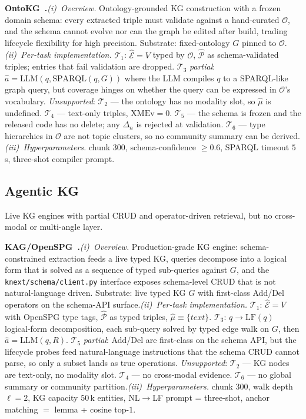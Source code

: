 \documentclass{article}
\begin{document}
\noindent\textbf{OntoKG~\citep{OntoKG}.}\quad\emph{(i)~Overview.} Ontology-grounded KG construction with a frozen domain schema: every extracted triple must validate against a hand-curated $\mathcal{O}$, and the schema cannot evolve nor can the graph be edited after build, trading lifecycle flexibility for high precision. Substrate: fixed-ontology $G$ pinned to $\mathcal{O}$.\quad\emph{(ii)~Per-task implementation.} $\mathcal{T}_1$: $\hat{\mathcal{E}}\!=\!V$ typed by $\mathcal{O}$, $\hat{\mathcal{P}}$ as schema-validated triples; entries that fail validation are dropped. $\mathcal{T}_3$ \emph{partial}: $\hat{a}\!=\!\mathrm{LLM}(q,\mathrm{SPARQL}(q,G))$ where the LLM compiles $q$ to a SPARQL-like graph query, but coverage hinges on whether the query can be expressed in $\mathcal{O}$'s vocabulary. \emph{Unsupported}: $\mathcal{T}_2$ — the ontology has no modality slot, so $\hat{\mu}$ is undefined. $\mathcal{T}_4$ — text-only triples, $\mathrm{XMEv}\!=\!0$. $\mathcal{T}_5$ — the schema is frozen and the released code has no delete; any $\Delta_n$ is rejected at validation. $\mathcal{T}_6$ — type hierarchies in $\mathcal{O}$ are not topic clusters, so no community summary can be derived.\quad\emph{(iii)~Hyperparameters.} chunk $300$, schema-confidence $\geq\!0.6$, SPARQL timeout $5$\,s, three-shot compiler prompt.

\subsection{Agentic KG}\label{app:b-akg}

Live KG engines with partial CRUD and operator-driven retrieval, but no cross-modal or multi-angle layer.

\noindent\textbf{KAG/OpenSPG~\citep{KAG}.}\quad\emph{(i)~Overview.} Production-grade KG engine: schema-constrained extraction feeds a live typed KG, queries decompose into a logical form that is solved as a sequence of typed sub-queries against $G$, and the \texttt{knext/schema/client.py} interface exposes schema-level CRUD that is not natural-language driven. Substrate: live typed KG $G$ with first-class Add/Del operators on the schema-API surface.\quad\emph{(ii)~Per-task implementation.} $\mathcal{T}_1$: $\hat{\mathcal{E}}\!=\!V$ with OpenSPG type tags, $\hat{\mathcal{P}}$ as typed triples, $\hat{\mu}\!\equiv\!\{\textit{text}\}$. $\mathcal{T}_3$: $q\!\to\!\mathrm{LF}(q)$ logical-form decomposition, each sub-query solved by typed edge walk on $G$, then $\hat{a}\!=\!\mathrm{LLM}(q,R)$. $\mathcal{T}_5$ \emph{partial}: Add/Del are first-class on the schema API, but the lifecycle probes feed natural-language instructions that the schema CRUD cannot parse, so only a subset lands as true operations. \emph{Unsupported}: $\mathcal{T}_2$ — KG nodes are text-only, no modality slot. $\mathcal{T}_4$ — no cross-modal evidence. $\mathcal{T}_6$ — no global summary or community partition.\quad\emph{(iii)~Hyperparameters.} chunk $300$, walk depth $\ell\!=\!2$, KG capacity $50$\,k entities, NL$\to$LF prompt = three-shot, anchor matching $=$ lemma + cosine top-$1$.
\end{document}
